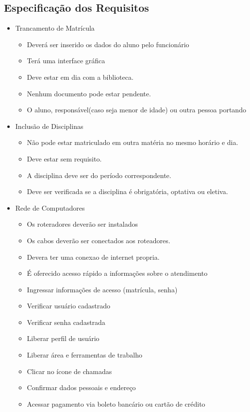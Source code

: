  \subsection{Especificação dos Requisitos}
   \begin{itemize}
   \item Trancamento de Matrícula 
	\begin{itemize}
	\item Deverá ser inserido os dados do aluno pelo funcionário
	\item Terá uma interface gráfica 
	\item Deve estar em dia com a biblioteca.
	\item Nenhum documento pode estar pendente.
	\item O aluno, responsável(caso seja menor de idade) ou outra pessoa portando 
	\end{itemize}
\item Inclusão de Disciplinas
	\begin{itemize}
	\item Não pode estar matriculado em outra matéria no mesmo horário e dia.
	\item Deve estar sem requisito.
	\item A disciplina deve ser do período correspondente.
	\item Deve ser verificada se a disciplina é obrigatória, optativa ou eletiva.
	\end{itemize}
\item Rede de Computadores
	\begin{itemize}
	\item Os roteradores deverão ser instalados
	\item Os cabos deverão ser conectados aos roteadores.
	\item Devera ter uma conexao de internet propria.
	\item É oferecido acesso rápido a informações sobre o atendimento
	\item Ingressar informações de acesso (matrícula, senha) 
	\item Verificar usuário cadastrado 
	\item Verificar senha cadastrada 
	\item Liberar perfil de usuário 
	\item Liberar área e ferramentas de trabalho
	\item Clicar no ícone de chamadas
	\item Confirmar dados pessoais e endereço
	\item Acessar pagamento via boleto bancário ou cartão de crédito

\end{itemize}
\end{itemize}
